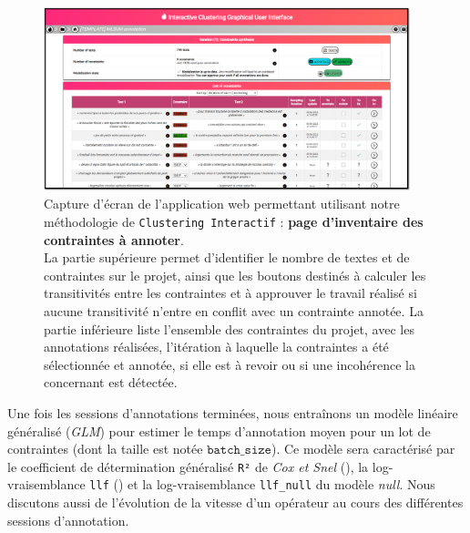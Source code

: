 			\begin{figure}[!htb]
				\centering
				\includegraphics[width=0.95\textwidth]{figures/etude-temps-annotation-0application-liste-contraintes}
				\caption{
					Capture d'écran de l'application web permettant utilisant notre méthodologie de \texttt{Clustering Interactif} : \textbf{page d'inventaire des contraintes à annoter}.\\
					La partie supérieure permet d'identifier le nombre de textes et de contraintes sur le projet, ainsi que les boutons destinés à calculer les transitivités entre les contraintes et à approuver le travail réalisé si aucune transitivité n'entre en conflit avec un contrainte annotée.
					La partie inférieure liste l'ensemble des contraintes du projet, avec les annotations réalisées, l'itération à laquelle la contraintes a été sélectionnée et annotée, si elle est à revoir ou si une incohérence la concernant est détectée.
				}
				\label{figure:4.3.1-ETUDE-COUTS-TEMPS-ANNOTATION-APPLICATION-LISTE-CONTRAINTES}
			\end{figure}
			
			
			Une fois les sessions d'annotations terminées, nous entraînons un modèle linéaire généralisé (\textit{GLM}) pour estimer le temps d'annotation moyen pour un lot de contraintes (dont la taille est notée $\texttt{batch\_size}$).
			Ce modèle sera caractérisé par le coefficient de détermination généralisé \texttt{R²} de \textit{Cox et Snel} (\cite{diamond-etal:1990:analysis-binary-data}), la log-vraisemblance \texttt{llf} (\cite{edwards:1992:likelihood}) et la log-vraisemblance \texttt{llf\_null} du modèle \textit{null}.
			Nous discutons aussi de l'évolution de la vitesse d'un opérateur au cours des différentes sessions d'annotation.

